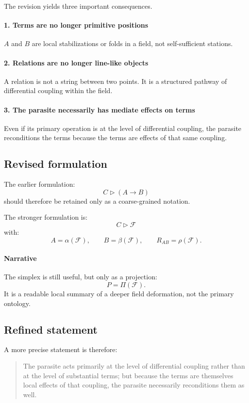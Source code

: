 The revision yields three important consequences.

\paragraph{1. Terms are no longer primitive positions}
\(A\) and \(B\) are local stabilizations or folds in a field, not self-sufficient stations.

\paragraph{2. Relations are no longer line-like objects}
A relation is not a string between two points. It is a structured pathway of differential coupling within the field.

\paragraph{3. The parasite necessarily has mediate effects on terms}
Even if its primary operation is at the level of differential coupling, the parasite
reconditions the terms because the terms are effects of that same coupling.

\subsection*{Revised formulation}

The earlier formulation:
\[
C \triangleright (A \to B)
\]
should therefore be retained only as a coarse-grained notation.

The stronger formulation is:
\[
C \triangleright \mathcal{F}
\]
with:
\[
A = \alpha(\mathcal{F}), \qquad B = \beta(\mathcal{F}), \qquad R_{AB} = \rho(\mathcal{F}).
\]

\paragraph{Narrative}
The simplex is still useful, but only as a projection:
\[
P = \Pi(\mathcal{F}).
\]
It is a readable local summary of a deeper field deformation, not the primary ontology.

\subsection*{Refined statement}

A more precise statement is therefore:

\begin{quote}
The parasite acts primarily at the level of differential coupling rather than at the level of substantial terms; but because the terms are themselves local effects of that coupling, the parasite necessarily reconditions them as well.
\end{quote}

